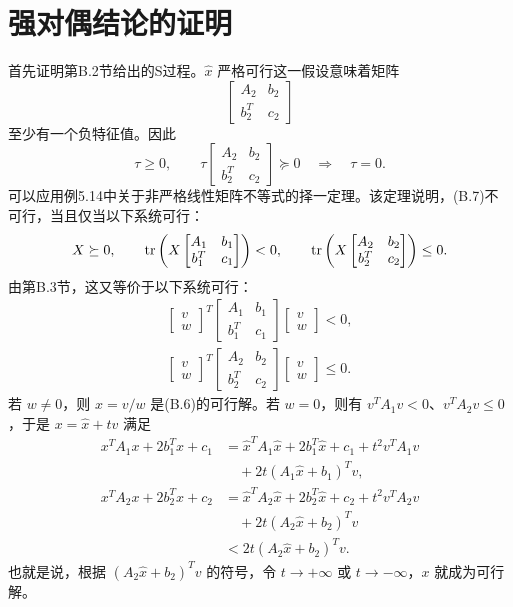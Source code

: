 \section{强对偶结论的证明}
首先证明第B.2节给出的S过程。$\hat x$ 严格可行这一假设意味着矩阵
\[
 \begin{bmatrix}A_2&b_2\\b_2^T&c_2\end{bmatrix}
\]
至少有一个负特征值。因此
\[
 \tau\geq0,\qquad
 \tau\begin{bmatrix}A_2&b_2\\b_2^T&c_2\end{bmatrix}\succeq0
 \quad\Longrightarrow\quad\tau=0.
\]
可以应用例5.14中关于非严格线性矩阵不等式的择一定理。该定理说明，(B.7)不可行，当且仅当以下系统可行：
\[
 X\succeq0,\qquad
 \operatorname{tr}\left(X\begin{bmatrix}A_1&b_1\\b_1^T&c_1\end{bmatrix}\right)<0,\qquad
 \operatorname{tr}\left(X\begin{bmatrix}A_2&b_2\\b_2^T&c_2\end{bmatrix}\right)\leq0.
\]
由第B.3节，这又等价于以下系统可行：
\begin{gather*}
 \begin{bmatrix}v\\w\end{bmatrix}^{\!T}
 \begin{bmatrix}A_1&b_1\\b_1^T&c_1\end{bmatrix}
 \begin{bmatrix}v\\w\end{bmatrix}<0,\\
 \begin{bmatrix}v\\w\end{bmatrix}^{\!T}
 \begin{bmatrix}A_2&b_2\\b_2^T&c_2\end{bmatrix}
 \begin{bmatrix}v\\w\end{bmatrix}\leq0.
\end{gather*}
若 $w\neq0$，则 $x=v/w$ 是(B.6)的可行解。若 $w=0$，则有 $v^TA_1v<0$、$v^TA_2v\leq0$，于是 $x=\hat x+tv$ 满足
\begin{align*}
 x^TA_1x+2b_1^Tx+c_1
 &=\hat x^TA_1\hat x+2b_1^T\hat x+c_1+t^2v^TA_1v\\
 &\quad+2t(A_1\hat x+b_1)^Tv,\\
 x^TA_2x+2b_2^Tx+c_2
 &=\hat x^TA_2\hat x+2b_2^T\hat x+c_2+t^2v^TA_2v\\
 &\quad+2t(A_2\hat x+b_2)^Tv\\
 &<2t(A_2\hat x+b_2)^Tv.
\end{align*}
也就是说，根据 $(A_2\hat x+b_2)^Tv$ 的符号，令 $t\to+\infty$ 或 $t\to-\infty$，$x$ 就成为可行解。

